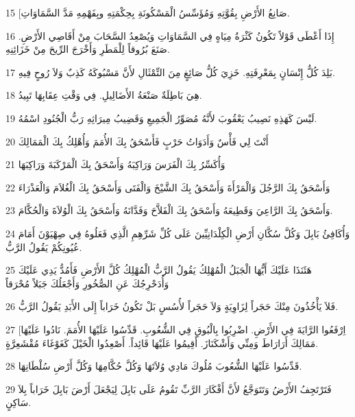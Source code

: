 \par 15 [صَانِعُ الأَرْضِ بِقُوَّتِهِ وَمُؤَسِّسُ الْمَسْكُونَةِ بِحِكْمَتِهِ وبِفَهْمِهِ مَدَّ السَّمَاوَاتِ.
\par 16 إِذَا أَعْطَى قَوْلاً تَكُونُ كَثْرَةُ مِيَاهٍ فِي السَّمَاوَاتِ وَيُصْعِدُ السَّحَابَ مِنْ أَقَاصِي الأَرْضِ. صَنَعَ بُرُوقاً لِلْمَطَرِ وَأَخْرَجَ الرِّيحَ مِنْ خَزَائِنِهِ.
\par 17 بَلِدَ كُلُّ إِنْسَانٍ بِمَعْرِفَتِهِ. خَزِيَ كُلُّ صَائِغٍ مِنَ التِّمْثَالِ لأَنَّ مَسْبُوكَهُ كَذِبٌ وَلاَ رُوحٍ فِيهِ.
\par 18 هِيَ بَاطِلَةٌ صَنْعَةُ الأَضَالِيلِ. فِي وَقْتِ عِقَابِهَا تَبِيدُ.
\par 19 لَيْسَ كَهَذِهِ نَصِيبُ يَعْقُوبَ لأَنَّهُ مُصَوِّرُ الْجَمِيعِ وَقَضِيبُ مِيرَاثِهِ رَبُّ الْجُنُودِ اسْمُهُ.
\par 20 أَنْتَ لِي فَأْسٌ وَأَدَوَاتُ حَرْبٍ فَأَسْحَقُ بِكَ الأُمَمَ وَأُهْلِكُ بِكَ الْمَمَالِكَ
\par 21 وَأُكَسِّرُ بِكَ الْفَرَسَ وَرَاكِبَهُ وَأَسْحَقُ بِكَ الْمَرْكَبَةَ وَرَاكِبَهَا
\par 22 وَأَسْحَقُ بِكَ الرَّجُلَ وَالْمَرْأَةَ وَأَسْحَقُ بِكَ الشَّيْخَ وَالْفَتَى وَأَسْحَقُ بِكَ الْغُلاَمَ وَالْعَذْرَاءَ
\par 23 وَأَسْحَقُ بِكَ الرَّاعِيَ وَقَطِيعَهُ وَأَسْحَقُ بِكَ الْفَلاَّحَ وَفَدَّانَهُ وَأَسْحَقُ بِكَ الْوُلاَةَ وَالْحُكَّامَ.
\par 24 وَأُكَافِئُ بَابِلَ وَكُلَّ سُكَّانِ أَرْضِ الْكِلْدَانِيِّينَ عَلَى كُلِّ شَرِّهِمِ الَّذِي فَعَلُوهُ فِي صِهْيَوْنَ أَمَامَ عُيُونِكُمْ يَقُولُ الرَّبُّ.
\par 25 هَئَنَذَا عَلَيْكَ أَيُّهَا الْجَبَلُ الْمُهْلِكُ يَقُولُ الرَّبُّ الْمُهْلِكُ كُلَّ الأَرْضِ فَأَمُدُّ يَدِي عَلَيْكَ وَأُدَحْرِجُكَ عَنِ الصُّخُورِ وَأَجْعَلُكَ جَبَلاً مُحْرَقاً
\par 26 فَلاَ يَأْخُذُونَ مِنْكَ حَجَراً لِزَاوِيَةٍ وَلاَ حَجَراً لأُسُسٍ بَلْ تَكُونُ خَرَاباً إِلَى الأَبَدِ يَقُولُ الرَّبُّ.
\par 27 [اِرْفَعُوا الرَّايَةَ فِي الأَرْضِ. اضْرِبُوا بِالْبُوقِ فِي الشُّعُوبِ. قَدِّسُوا عَلَيْهَا الأُمَمَ. نَادُوا عَلَيْهَا مَمَالِكَ أَرَارَاطَ وَمِنِّي وَأَشْكَنَازَ. أَقِيمُوا عَلَيْهَا قَائِداً. أَصْعِدُوا الْخَيْلَ كَغَوْغَاءَ مُقْشَعِرَّةٍ.
\par 28 قَدِّسُوا عَلَيْهَا الشُّعُوبَ مُلُوكَ مَادِي وُلاَتَهَا وَكُلَّ حُكَّامِهَا وَكُلَّ أَرْضِ سُلْطَانِهَا.
\par 29 فَتَرْتَجِفُ الأَرْضُ وَتَتَوَجَّعُ لأَنَّ أَفْكَارَ الرَّبِّ تَقُومُ عَلَى بَابِلَ لِيَجْعَلَ أَرْضَ بَابِلَ خَرَاباً بِلاَ سَاكِنٍ.
